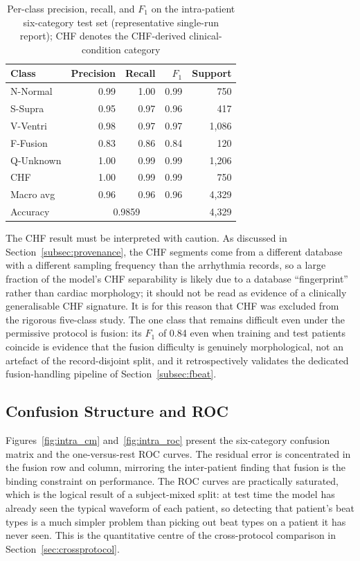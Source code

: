 \begin{table}[!t]
\centering
\caption[Per-class precision, recall, and $F_1$ on the intra-patient six-category test set]{Per-class precision, recall, and $F_1$ on the intra-patient six-category test set (representative single-run report); CHF denotes the CHF-derived clinical-condition category}
\label{tab:intra_perclass}
\begin{tabular}{lrrrr}
\toprule
\textbf{Class} & \textbf{Precision} & \textbf{Recall} & \textbf{$F_1$} & \textbf{Support} \\
\midrule
N-Normal  & 0.99 & 1.00 & 0.99 & 750 \\
S-Supra   & 0.95 & 0.97 & 0.96 & 417 \\
V-Ventri  & 0.98 & 0.97 & 0.97 & 1{,}086 \\
F-Fusion  & 0.83 & 0.86 & 0.84 & 120 \\
Q-Unknown & 1.00 & 0.99 & 0.99 & 1{,}206 \\
CHF       & 1.00 & 0.99 & 0.99 & 750 \\
\midrule
Macro avg & 0.96 & 0.96 & 0.96 & 4{,}329 \\
Accuracy  & \multicolumn{3}{c}{0.9859} & 4{,}329 \\
\bottomrule
\end{tabular}
\end{table}

The CHF result must be interpreted with caution. As discussed in
Section~\ref{subsec:provenance}, the CHF segments come from a different
database with a different sampling frequency than the arrhythmia records, so
a large fraction of the model's CHF separability is likely due to a database
``fingerprint'' rather than cardiac morphology; it should not be read as
evidence of a clinically generalisable CHF signature. It is for this reason
that CHF was excluded from the rigorous five-class study. The one class that
remains difficult even under the permissive protocol is fusion: its $F_1$ of
0.84 even when training and test patients coincide is evidence that the
fusion difficulty is genuinely morphological, not an artefact of the
record-disjoint split, and it retrospectively validates the dedicated
fusion-handling pipeline of Section~\ref{subsec:fbeat}.

\subsection{Confusion Structure and ROC}
\label{subsec:intra_cm}

Figures~\ref{fig:intra_cm} and~\ref{fig:intra_roc} present the six-category
confusion matrix and the one-versus-rest ROC curves. The residual error is
concentrated in the fusion row and column, mirroring the inter-patient
finding that fusion is the binding constraint on performance. The ROC curves
are practically saturated, which is the logical result of a subject-mixed
split: at test time the model has already seen the typical waveform of each
patient, so detecting that patient's beat types is a much simpler problem
than picking out beat types on a patient it has never seen. This is the
quantitative centre of the cross-protocol comparison in
Section~\ref{sec:crossprotocol}.

